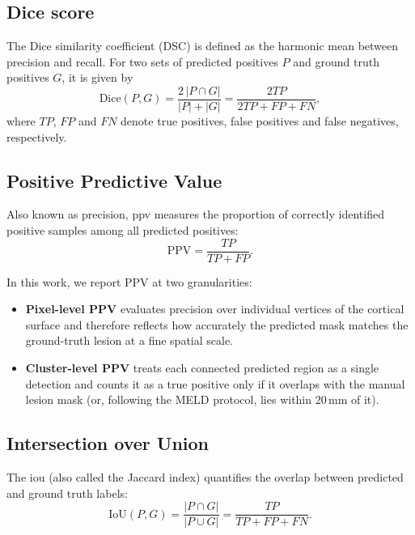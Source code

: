 \documentclass[FCD_GNN.tex]{subfiles}
\begin{document}
\subsection*{Dice score} 
The Dice similarity coefficient (DSC) is defined as the harmonic mean between precision and recall. 
For two sets of predicted positives $P$ and ground truth positives $G$, it is given by
\begin{equation}
\mathrm{Dice}(P,G) = \frac{2 \, |P \cap G|}{|P| + |G|} = \frac{2TP}{2TP + FP + FN},
\end{equation}
where $TP$, $FP$ and $FN$ denote true positives, false positives and false negatives, respectively.

\subsection*{Positive Predictive Value} 
Also known as precision, \ac{ppv} measures the proportion of correctly identified positive samples 
among all predicted positives:
\begin{equation}
\mathrm{PPV} = \frac{TP}{TP + FP}.
\end{equation}

In this work, we report PPV at two granularities:

\begin{itemize}
\item \textbf{Pixel-level PPV} evaluates precision over individual vertices of the cortical surface and 
therefore reflects how accurately the predicted mask matches the ground-truth lesion at a fine spatial scale.

\item \textbf{Cluster-level PPV} treats each connected predicted region as a single detection and counts it as 
a true positive only if it overlaps with the manual lesion mask (or, following the MELD protocol, lies within 
20\,mm of it).
\end{itemize}

\subsection*{Intersection over Union} 
The \ac{iou} (also called the Jaccard index) quantifies the overlap between predicted and ground truth labels:
\begin{equation}
\mathrm{IoU}(P,G) = \frac{|P \cap G|}{|P \cup G|} = \frac{TP}{TP + FP + FN}.
\end{equation}
\end{document}
